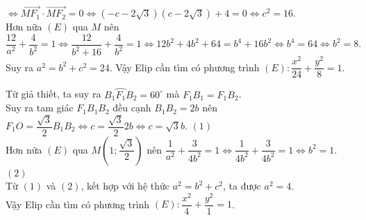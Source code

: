 \begin{bt}
{\begin{listEX}
		$ \Leftrightarrow \overrightarrow{MF_1}\cdot \overrightarrow{MF_2}=0 \Leftrightarrow \left(-c-2\sqrt{3}\right)\left(c-2\sqrt{3}\right)+4=0 \Leftrightarrow c^2=16$.\\
		Hơn nữa $(E)$ qua $M$ nên $$\dfrac{12}{a^2}+\dfrac{4}{b^2}=1 \Leftrightarrow \dfrac{12}{b^2+16}+\dfrac{4}{b^2}=1 \Leftrightarrow 12b^2+4b^2+64=b^4+16b^2 \Leftrightarrow b^4=64 \Leftrightarrow b^2=8.$$
		Suy ra $a^2=b^2+c^2=24$. Vậy Elip cần tìm có phương trình $(E)\colon \dfrac{x^2}{24}+\dfrac{y^2}{8}=1$.\\
		\item Từ giả thiết, ta suy ra $\widehat{B_1F_1B_2}=60^{\circ}$ mà $F_1B_1=F_1B_2$.\\
		Suy ra tam giác $F_1B_1B_2$ đều cạnh $B_1B_2=2b$ nên\\
		$F_1O=\dfrac{\sqrt{3}}{2}B_1B_2 \Leftrightarrow c=\dfrac{\sqrt{3}}{2}2b \Leftrightarrow c=\sqrt{3}b.$ \hfill $(1)$ \\
		Hơn nữa $(E)$ qua $M\left(1;\dfrac{\sqrt{3}}{2}\right)$ nên $\dfrac{1}{a^2}+\dfrac{3}{4b^2}=1 \Leftrightarrow \dfrac{1}{4b^2}+\dfrac{3}{4b^2}=1 \Leftrightarrow b^2=1.$ \hfill$(2)$ \\
		Từ $(1)$ và $(2)$, kết hợp với hệ thức $a^2=b^2+c^2$, ta được $a^2=4$.\\
		Vậy Elip cần tìm có phương trình $(E)\colon \dfrac{x^2}{4}+\dfrac{y^2}{1}=1$.
	\end{listEX}
}
\end{bt}

